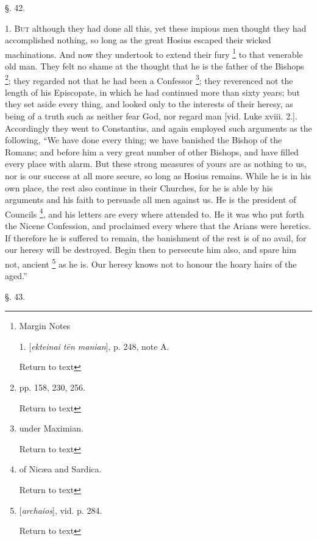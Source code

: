 
§. 42.

1. B\textsc{ut} although they had
done all this, yet these impious men thought they had accomplished
nothing, so long as the great Hosius escaped their wicked
machinations. And now they undertook to extend their fury \footnote{Margin Notes

1. [\emph{ekteinai t\={e}n manian}], p. 248,
note A.

Return to text} to that venerable old man. They felt no shame at the thought
that he is the father of the Bishops \footnote{pp. 158, 230, 256.

Return to text}; they regarded not that he had been a Confessor \footnote{under Maximian.

Return to text}; they reverenced not the length of his Episcopate, in which he
had continued more than sixty years; but they set aside every thing,
and looked only to the interests of their heresy, as being of a truth
such as neither fear God, nor regard man [vid. Luke xviii. 2.].
Accordingly they went to Constantius, and again employed such
arguments as the following, ``We have done every thing; we have
banished the Bishop of the Romans; and before him a very great number
of other Bishops, and have filled every place with alarm. But these
strong measures of yours are as nothing to us, nor is our success at
all more secure, so long as Hosius remains. While he is in his own
place, the rest also continue in their Churches, for he is able by his
arguments and his faith to persuade all men against us. He is the
president of Councils \footnote{of Nicæa and Sardica.

Return to text},
and his letters are every where attended to. He it was who put forth
the Nicene Confession, and proclaimed every where that the Arians were
heretics. If therefore he is suffered to remain, the banishment of the
rest is of no avail, for our heresy will be destroyed. Begin then to
persecute him also, and spare him not, ancient \footnote{[\emph{archaios}], vid. p. 284.

Return to text} as he is. Our heresy knows not to honour the hoary hairs of the
aged.''

§. 43.

